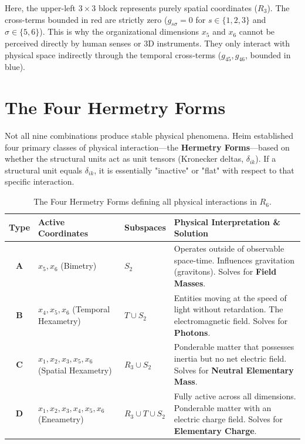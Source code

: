 \documentclass[11pt,a4paper,oneside]{article}
\begin{document}
Here, the upper-left $3 \times 3$ block represents purely spatial coordinates ($R_3$). The cross-terms bounded in red are strictly zero ($g_{s\sigma} = 0$ for $s \in \{1,2,3\}$ and $\sigma \in \{5,6\}$). This is why the organizational dimensions $x_5$ and $x_6$ cannot be perceived directly by human senses or 3D instruments. They only interact with physical space indirectly through the temporal cross-terms ($g_{45}, g_{46}$, bounded in blue).

\section{The Four Hermetry Forms}

Not all nine combinations produce stable physical phenomena. Heim established four primary classes of physical interaction—the \textbf{Hermetry Forms}—based on whether the structural units act as unit tensors (Kronecker deltas, $\delta_{ik}$). If a structural unit equals $\delta_{ik}$, it is essentially "inactive" or "flat" with respect to that specific interaction.

\begin{table}[htbp]
\centering
\renewcommand{\arraystretch}{1.5}
\begin{tabular}{|c|p{3.5cm}|p{2cm}|p{6cm}|}
\hline
\rowcolor{theoryblue!10}
\textbf{Type} & \textbf{Active Coordinates} & \textbf{Subspaces} & \textbf{Physical Interpretation \& Solution} \\ \hline
\textbf{A} & $x_5, x_6$ \newline (Bimetry) & $S_2$ & Operates outside of observable space-time. Influences gravitation (gravitons). Solves for \textbf{Field Masses}. \\ \hline
\textbf{B} & $x_4, x_5, x_6$ \newline (Temporal Hexametry) & $T \cup S_2$ & Entities moving at the speed of light without retardation. The electromagnetic field. Solves for \textbf{Photons}. \\ \hline
\textbf{C} & $x_1, x_2, x_3, x_5, x_6$ \newline (Spatial Hexametry) & $R_3 \cup S_2$ & Ponderable matter that possesses inertia but no net electric field. Solves for \textbf{Neutral Elementary Mass}. \\ \hline
\textbf{D} & $x_1, x_2, x_3, x_4, x_5, x_6$ \newline (Eneametry) & $R_3 \cup T \cup S_2$ & Fully active across all dimensions. Ponderable matter with an electric charge field. Solves for \textbf{Elementary Charge}. \\ \hline
\end{tabular}
\caption{The Four Hermetry Forms defining all physical interactions in $R_6$.}
\end{table}
\end{document}
